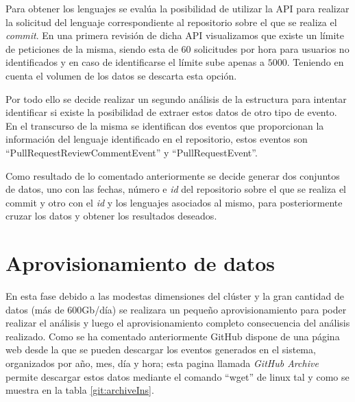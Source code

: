 Para obtener los lenguajes se evalúa la posibilidad de utilizar la \gls{API} para realizar la solicitud del lenguaje correspondiente al repositorio sobre el que se realiza el \textit{commit}. En una primera revisión de dicha \gls{API} visualizamos que existe un límite de peticiones de la misma, siendo esta de $60$ solicitudes por hora para usuarios no identificados y en caso de identificarse el límite sube apenas a $5000$. Teniendo en cuenta el volumen de los datos se descarta esta opción.

Por todo ello se decide realizar un segundo análisis de la estructura para intentar identificar si existe la posibilidad de extraer estos datos de otro tipo de evento. En el transcurso de la misma se identifican dos eventos que proporcionan la información del lenguaje identificado en el repositorio, estos eventos son ``PullRequestReviewCommentEvent'' y ``PullRequestEvent''.

Como resultado de lo comentado anteriormente se decide generar dos conjuntos de datos, uno con las fechas, número e \textit{id} del repositorio sobre el que se realiza el commit y otro con el \textit{id} y los lenguajes asociados al mismo, para posteriormente cruzar los datos y obtener los resultados deseados.


\section{Aprovisionamiento de datos}
En esta fase debido a las modestas dimensiones del clúster y la gran cantidad de datos (más de $600$Gb/día) se realizara un pequeño aprovisionamiento para poder realizar el análisis y luego el aprovisionamiento completo consecuencia del análisis realizado. Como se ha comentado anteriormente GitHub dispone de una página web desde la que se pueden descargar los eventos generados en el sistema, organizados por año, mes, día y hora; esta pagina llamada \textit{GitHub Archive} \cite{githubArchive} permite descargar estos datos mediante el comando ``wget'' de linux tal y como se muestra en la tabla \ref{git:archiveIns}.

\begin{table}[htp!]
	\centering
	\caption{Tabla de instrucciones de descarga de \textit{GitHub Archive}\cite{githubArchive}.}
	\label{git:archiveIns}
\end{table}
